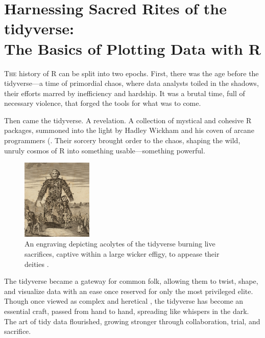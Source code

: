 \chapter[Harnessing Sacred Rites of the tidyverse: Plotting Basics]{Harnessing Sacred Rites of the tidyverse:\\ \huge The Basics of Plotting Data with R}

\lettrine{T}{he} history of R can be split into two epochs. First, there was the age before the tidyverse—a time of primordial chaos, where data analysts toiled in the shadows, their efforts marred by inefficiency and hardship. It was a brutal time, full of necessary violence, that forged the tools for what was to come.

Then came the tidyverse. A revelation. A collection of mystical and cohesive R packages, summoned into the light by Hadley Wickham and his coven of arcane programmers (\parencite{Wickham2019}. Their sorcery brought order to the chaos, shaping the wild, unruly cosmos of R into something usable—something powerful.

\begin{figure}
  \begin{center}
    \includegraphics[width=0.3\textwidth]{graphics/ch2Figs/t_pennant.pdf}
  \end{center}
    \caption{An engraving depicting acolytes of the tidyverse burning live sacrifices, captive within a large wicker effigy, to appease their deities \parencite{Pennant1784}.}
    \label{fig:ch2_wicker}
\end{figure}

The tidyverse became a gateway for common folk, allowing them to twist, shape, and visualize data with an ease once reserved for only the most privileged elite. Though once viewed as complex and heretical \parencite{Muenchen}, the tidyverse has become an essential craft, passed from hand to hand, spreading like whispers in the dark. The art of tidy data flourished, growing stronger through collaboration, trial, and sacrifice.

